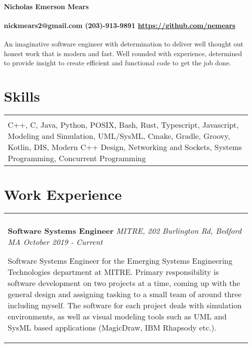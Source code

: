 \documentclass[10pt]{article}
\begin{document}
\paragraph{\centering \huge Nicholas Emerson Mears \\ }
\paragraph{\centering nickmears2@gmail.com (203)-913-9891 \url{https://github.com/nemears}\\}

An imaginative software engineer with determination to deliver well thought out honest work that is modern and fast. Well rounded with experience, 
determined to provide insight to create efficient and functional code to get the job done.

\section*{Skills}
\begin{tabular}{p{18.5cm}}
  \hline
  \multicolumn{1}{c}{} \\
  C++, C, Java, Python, POSIX, Bash, Rust, Typescript, Javascript, Modeling and Simulation, UML/SysML, Cmake, Gradle, Groovy, Kotlin, 
  DIS, Modern C++ Design, Networking and Sockets, Systems Programming, Concurrent Programming
\end{tabular}

\section*{Work Experience}
\begin{tabular}{p{18.5cm}}
    \hline
    \multicolumn{1}{c}{} \\
    \large \textbf{Software Systems Engineer} \normalsize \textit{MITRE, 202 Burlington Rd, Bedford MA \hfill October 2019 - Current}

    \> Software Systems Engineer for the Emerging Systems Engineering Technologies department at MITRE. Primary responsibility 
    is software development on two projects at a time, coming up with the general design and assigning tasking to a small team
    of around three including myself. The software for each project deals with simulation environments, as well as visual modeling tools such as 
    UML and SysML based applications (MagicDraw, IBM Rhapsody etc.).

\end{tabular}
\end{document}
